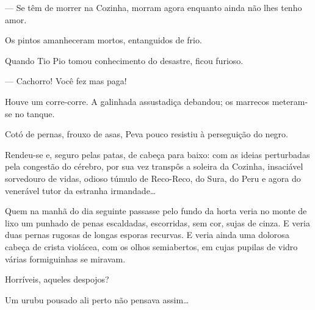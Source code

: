 --- Se têm de morrer na Cozinha, morram agora enquanto ainda não lhes
tenho amor.

Os pintos amanheceram mortos, entanguidos de frio.

Quando Tio Pio tomou conhecimento do desastre, ficou furioso.

--- Cachorro! Você fez mas paga!

Houve um corre-corre. A galinhada assustadiça debandou; os marrecos
meteram-se no tanque.

Cotó de pernas, frouxo de asas, Peva pouco resistiu à perseguição do
negro.

Rendeu-se e, seguro pelas patas, de cabeça para baixo: com as ideias
perturbadas pela congestão do cérebro, por sua vez transpôs a soleira da
Cozinha, insaciável sorvedouro de vidas, odioso túmulo de Reco-Reco, do
Sura, do Peru e agora do venerável tutor da estranha irmandade\ldots{}

Quem na manhã do dia seguinte passasse pelo fundo da horta veria no
monte de lixo um punhado de penas escaldadas, escorridas, sem cor, sujas
de cinza. E veria duas pernas rugosas de longas esporas recurvas. E
veria ainda uma dolorosa cabeça de crista violácea, com os olhos
semiabertos, em cujas pupilas de vidro várias formiguinhas se miravam.

Horríveis, aqueles despojos?

Um urubu pousado ali perto não pensava assim\ldots{}

